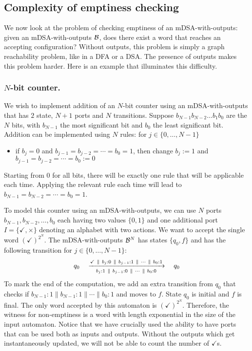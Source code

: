 \subsection{Complexity of emptiness checking}

We now look at the problem of checking emptiness of an mDSA-with-outputs: given an mDSA-with-outputs $\mathcal{B}$, does there exist a word that reaches an accepting configuration? Without outputs, this problem is simply a graph reachability problem, like in a DFA or a DSA. The presence of outputs makes this problem harder. Here is an example that illuminates this difficulty.

\subsubsection*{$N$-bit counter.} We wish to implement addition of an $N$-bit counter using an mDSA-with-outputs that has $2$ state, $N+1$ ports and $N$ transitions. Suppose $b_{N-1} b_{N-2} \dots b_1 b_0$ are the $N$ bits, with $b_{N-1}$ the most significant bit and $b_0$ the least significant bit. Addition can be implemented using $N$ rules: for $j \in \{0, \dots, N-1\}$
\begin{itemize}
\item if $b_j = 0$ and $b_{j-1} = b_{j-2} = \cdots = b_0 = 1$, then change $b_j:= 1$ and $b_{j-1} = b_{j-2} = \cdots = b_0 := 0$
\end{itemize}
Starting from $0$ for all bits, there will be exactly one rule that will be applicable each time. Applying the relevant rule each time will lead to $b_{N-1} = b_{N-2} = \cdots = b_0 = 1$.

To model this counter using an mDSA-with-outputs, we can use $N$ ports $b_{N-1}, b_{N-2}, \dots, b_0$ each having two values $\{0, 1\}$ and one additional port $I = \{ \checkmark, \times \}$ denoting an alphabet with two actions. We want to accept the single word $(\checkmark)^{2^N}$. The mDSA-with-outputs $\mathcal{B}^N$ has states $\{q_0, f\}$ and has the following transition for $j\in \{0, \dots, N-1\}$:
\begin{align*}
q_0 \quad \xrightarrow[~~b_j:1 ~\parallel~ b_{j-1}:0 ~\parallel~ \cdots ~\parallel~ b_0: 0~~]{\checkmark ~\parallel~ b_j:0 ~\parallel~ b_{j-1}:1 ~\parallel~ \cdots ~\parallel~ b_0: 1} \quad q_0
\end{align*}
To mark the end of the computation, we add an extra transition from $q_0$ that checks if $b_{N-1}:1 \parallel b_{N-1}:1 \parallel \cdots \parallel b_0:1$ and moves to $f$. State $q_0$ is initial and $f$ is final. The only word accepted by this automaton is $(\checkmark)^{2^N}$. Therefore, the witness for non-emptiness is a word with length exponential in the size of the input automaton. Notice that we have crucially used the ability to have ports that can be used both as inputs and outputs. Without the outputs which get instantaneously updated, we will not be able to count the number of $\checkmark$s. 

